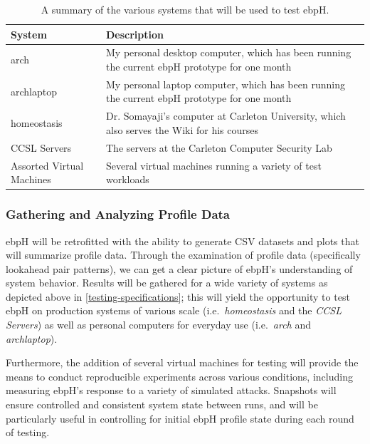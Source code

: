 \documentclass[
  12pt]{findlay}
\begin{document}
\begin{table}
\caption[A summary of the various systems that will be used to test ebpH]
{
A summary of the various systems that will be used to test ebpH.
}
\label{testing-specifications}
\begin{center}
\begin{tabular}{|l|p{4in}|}
\hline
\textbf{System} & \textbf{Description}\\
\hline
\hline
arch & My personal desktop computer, which has been running the current ebpH prototype for one month\\
\hline
archlaptop & My personal laptop computer, which has been running the current ebpH prototype for one month\\
\hline
homeostasis & Dr. Somayaji's computer at Carleton University, which also serves the Wiki for his courses\\
\hline
CCSL Servers & The servers at the Carleton Computer Security Lab\\
\hline
Assorted Virtual Machines & Several virtual machines running a variety of test workloads\\
\hline
\end{tabular}
\end{center}
\end{table}

\hypertarget{gathering-and-analyzing-profile-data}{%
\subsubsection{Gathering and Analyzing Profile
Data}\label{gathering-and-analyzing-profile-data}}

ebpH will be retrofitted with the ability to generate CSV datasets and
plots that will summarize profile data. Through the examination of
profile data (specifically lookahead pair patterns), we can get a clear
picture of ebpH's understanding of system behavior. Results will be
gathered for a wide variety of systems as depicted above in
\autoref{testing-specifications}; this will yield the opportunity to
test ebpH on production systems of various scale
(i.e.~\emph{homeostasis} and the \emph{CCSL Servers}) as well as
personal computers for everyday use (i.e.~\emph{arch} and
\emph{archlaptop}).

Furthermore, the addition of several virtual machines for testing will
provide the means to conduct reproducible experiments across various
conditions, including measuring ebpH's response to a variety of
simulated attacks. Snapshots will ensure controlled and consistent
system state between runs, and will be particularly useful in
controlling for initial ebpH profile state during each round of testing.
\end{document}
